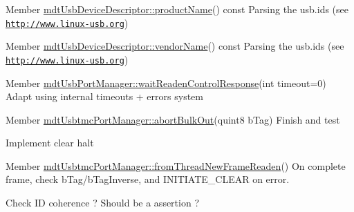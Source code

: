 \label{todo__todo000031}
\hypertarget{todo__todo000031}{}
 
\begin{DoxyDescription}
\item[Member \hyperlink{classmdt_usb_device_descriptor_a626afc71d8e72600f12259ac6f5a5866}{mdtUsbDeviceDescriptor::productName}() const  ]Parsing the usb.ids (see \href{http://www.linux-usb.org}{\tt http://www.linux-\/usb.org}) 
\end{DoxyDescription}

\label{todo__todo000030}
\hypertarget{todo__todo000030}{}
 
\begin{DoxyDescription}
\item[Member \hyperlink{classmdt_usb_device_descriptor_ac2f746ebd5540b65bf00f82c991f5c3b}{mdtUsbDeviceDescriptor::vendorName}() const  ]Parsing the usb.ids (see \href{http://www.linux-usb.org}{\tt http://www.linux-\/usb.org}) 
\end{DoxyDescription}

\label{todo__todo000036}
\hypertarget{todo__todo000036}{}
 
\begin{DoxyDescription}
\item[Member \hyperlink{classmdt_usb_port_manager_ad91c432e85737f2224bbae651fb65a8d}{mdtUsbPortManager::waitReadenControlResponse}(int timeout=0) ]Adapt using internal timeouts + errors system 
\end{DoxyDescription}

\label{todo__todo000039}
\hypertarget{todo__todo000039}{}
 
\begin{DoxyDescription}
\item[Member \hyperlink{classmdt_usbtmc_port_manager_af412ba1b1e7e56ebecd2e59cb6bf607a}{mdtUsbtmcPortManager::abortBulkOut}(quint8 bTag) ]Finish and test 

Implement clear halt 
\end{DoxyDescription}

\label{todo__todo000041}
\hypertarget{todo__todo000041}{}
 
\begin{DoxyDescription}
\item[Member \hyperlink{classmdt_usbtmc_port_manager_aca42b343ae1f6a324e6e45968f03bbea}{mdtUsbtmcPortManager::fromThreadNewFrameReaden}() ]On complete frame, check bTag/bTagInverse, and INITIATE\_\-CLEAR on error. 

Check ID coherence ? Should be a assertion ? 
\end{DoxyDescription}

